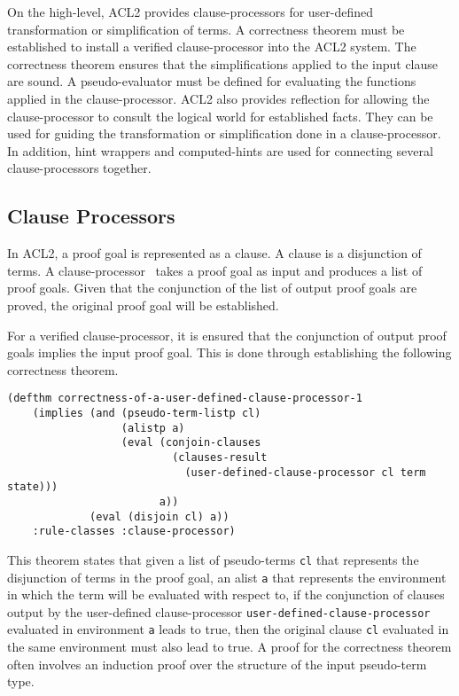 On the high-level, ACL2 provides clause-processors for user-defined
transformation or simplification of terms.
A correctness theorem must be established to install a verified clause-processor
into the ACL2 system. The correctness theorem ensures that the simplifications
applied to the input clause are sound.
A pseudo-evaluator must be defined for evaluating the functions applied in the
clause-processor. ACL2 also provides reflection for allowing the
clause-processor to consult the logical world for established facts. They can be
used for guiding the transformation or simplification done in a
clause-processor. In addition, hint wrappers and computed-hints are used for
connecting several clause-processors together.


\subsection{Clause Processors}\label{subsec:cp}
In ACL2, a proof goal is represented as a clause. A clause is a disjunction of
terms. A clause-processor~\cite{clause-processor} takes a proof goal as input
and produces a list of proof goals. Given that the conjunction of the list of
output proof goals are proved, the original proof goal will be established.

For a verified clause-processor, it is ensured that the conjunction of output
proof goals implies the input proof goal. This is done through establishing
the following correctness theorem.

\begin{lstlisting}[style=lisp, label={prog:cp1}, caption={Correctness theorem of
  a user defined clause-proecssor}]
  (defthm correctness-of-a-user-defined-clause-processor-1
    (implies (and (pseudo-term-listp cl)
                  (alistp a)
                  (eval (conjoin-clauses
                          (clauses-result
                            (user-defined-clause-processor cl term state)))
                        a))
             (eval (disjoin cl) a))
    :rule-classes :clause-processor)
\end{lstlisting}

This theorem states that given a list of pseudo-terms \texttt{cl} that
represents the disjunction of terms in the proof goal, an alist \texttt{a} that
represents the environment in which the term will be evaluated with respect to,
if the conjunction of clauses output by the user-defined clause-processor
\texttt{user-defined-clause-processor} evaluated in environment \texttt{a} leads
to true, then the original clause \texttt{cl} evaluated in the same environment
must also lead to true. A proof for the correctness theorem often involves an
induction proof over the structure of the input pseudo-term type.


